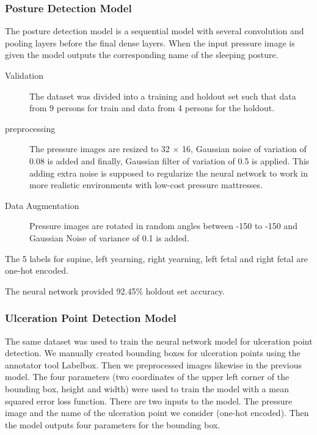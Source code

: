 \subsubsection{Posture Detection Model}

The posture detection model is a sequential model with several convolution and pooling layers before the final dense layers. When the input pressure image is given the model outputs the corresponding name of the sleeping posture.


\begin{description}
	\item[Validation] The dataset was divided into a training and holdout set such that data from 9 persons for train and data from 4 persons for the holdout.
	\item[preprocessing] The pressure images are resized to 32 $\times$ 16, Gaussian noise of variation of 0.08 is added and finally, Gaussian filter of variation of 0.5 is applied. This adding extra noise is supposed to regularize the neural network to work in more realistic environments with low-cost pressure mattresses.
	\item[Data Augmentation]  Pressure images are rotated in random angles between -150 to -150 and Gaussian Noise of variance of 0.1 is added.	
\end{description}

The 5 labels for supine, left yearning, right yearning, left fetal and right fetal are one-hot encoded. 

The neural network provided 92.45\% holdout set accuracy.


\subsubsection{Ulceration Point Detection Model}

The same dataset was used to train the neural network model for ulceration point detection. We manually created bounding boxes for ulceration points using the annotator tool Labelbox\textsuperscript{\textregistered}. Then we preprocessed images likewise in the previous model.  The four parameters (two coordinates of the upper left corner of the bounding box, height and width) were used to train the model with a mean squared error loss function. There are two inputs to the model. The pressure image and the name of the ulceration point we consider (one-hot encoded). Then the model outputs four parameters for the bounding box. 


